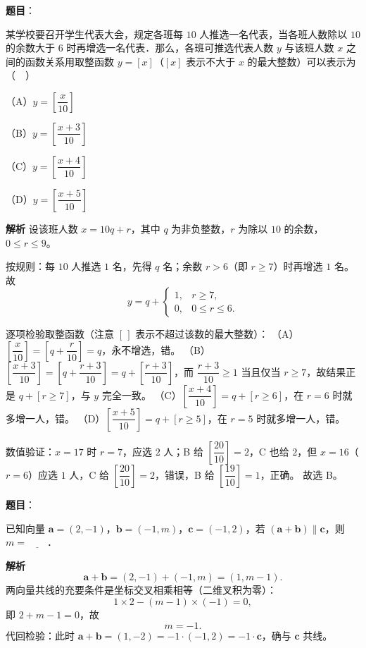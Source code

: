 \begin{answer}

\textbf{题目}：

某学校要召开学生代表大会，规定各班每 $10$ 人推选一名代表，当各班人数除以 $10$ 的余数大于 $6$ 时再增选一名代表．那么，各班可推选代表人数 $y$ 与该班人数 $x$ 之间的函数关系用取整函数 $y=[x]$（$[x]$ 表示不大于 $x$ 的最大整数）可以表示为（　）

（A）$y=\left[\dfrac{x}{10}\right]$

（B）$y=\left[\dfrac{x+3}{10}\right]$

（C）$y=\left[\dfrac{x+4}{10}\right]$

（D）$y=\left[\dfrac{x+5}{10}\right]$

\textbf{解析}
设该班人数 $x=10q+r$，其中 $q$ 为非负整数，$r$ 为除以 $10$ 的余数，$0\leqslant r\leqslant 9$。

按规则：每 $10$ 人推选 $1$ 名，先得 $q$ 名；余数 $r>6$（即 $r\geqslant 7$）时再增选 $1$ 名。故
\nopagebreak[4]
\[y=q+\begin{cases}1,&r\geqslant 7,\\0,&0\leqslant r\leqslant 6.\end{cases}\]

逐项检验取整函数（注意 $[\,]$ 表示不超过该数的最大整数）：
（A）$\left[\dfrac{x}{10}\right]=\left[q+\dfrac r{10}\right]=q$，永不增选，错。
（B）$\left[\dfrac{x+3}{10}\right]=\left[q+\dfrac{r+3}{10}\right]=q+\left[\dfrac{r+3}{10}\right]$，而 $\dfrac{r+3}{10}\geqslant 1$ 当且仅当 $r\geqslant 7$，故结果正是 $q+[r\geqslant 7]$，与 $y$ 完全一致。
（C）$\left[\dfrac{x+4}{10}\right]=q+[r\geqslant 6]$，在 $r=6$ 时就多增一人，错。
（D）$\left[\dfrac{x+5}{10}\right]=q+[r\geqslant 5]$，在 $r=5$ 时就多增一人，错。

数值验证：$x=17$ 时 $r=7$，应选 $2$ 人；B 给 $\left[\dfrac{20}{10}\right]=2$，C 也给 $2$，但 $x=16$（$r=6$）应选 $1$ 人，C 给 $\left[\dfrac{20}{10}\right]=2$，错误，B 给 $\left[\dfrac{19}{10}\right]=1$，正确。
故选 B。


\end{answer}
\begin{answer}

\textbf{题目}：

已知向量 $\boldsymbol a=(2,-1)$，$\boldsymbol b=(-1,m)$，$\boldsymbol c=(-1,2)$，若 $(\boldsymbol a+\boldsymbol b)\parallel\boldsymbol c$，则 $m=\underline{\qquad}$．

\textbf{解析}
\nopagebreak[4]
\[\boldsymbol a+\boldsymbol b=(2,-1)+(-1,m)=(1,m-1).\]
两向量共线的充要条件是坐标交叉相乘相等（二维叉积为零）：
\nopagebreak[4]
\[1\times 2-(m-1)\times(-1)=0,\]
即 $2+m-1=0$，故
\nopagebreak[4]
\[m=-1.\]
代回检验：此时 $\boldsymbol a+\boldsymbol b=(1,-2)=-1\cdot(-1,2)=-1\cdot\boldsymbol c$，确与 $\boldsymbol c$ 共线。


\end{answer}

